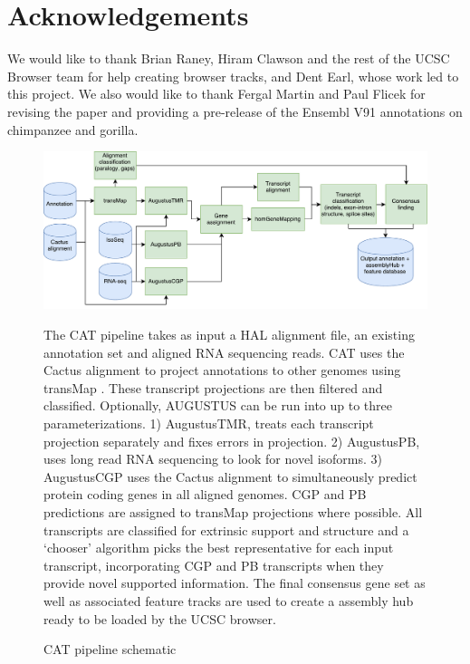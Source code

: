 \documentclass[fleqn,10pt]{wlscirep}
\begin{document}
\section*{Acknowledgements}
We would like to thank Brian Raney, Hiram Clawson and the rest of the UCSC Browser team for help creating browser tracks, and Dent Earl, whose work led to this project. We also would like to thank Fergal Martin and Paul Flicek for revising the paper and providing a pre-release of the Ensembl V91 annotations on chimpanzee and gorilla.


\clearpage

\begin{figure}
\centering
\includegraphics[width=\textwidth,height=\textheight,keepaspectratio]{CAT.pdf}
\caption{CAT pipeline schematic}
The CAT pipeline takes as input a HAL alignment file, an existing annotation set and aligned RNA sequencing reads. CAT uses the Cactus alignment to project annotations to other genomes using transMap \cite{stanke2008using}. These transcript projections are then filtered and classified. Optionally, AUGUSTUS can be run into up to three parameterizations. 1) AugustusTMR, treats each transcript projection separately and fixes errors in projection. 2) AugustusPB, uses long read RNA sequencing to look for novel isoforms. 3) AugustusCGP \cite{konig2015simultaneous} uses the Cactus alignment to simultaneously predict protein coding genes in all aligned genomes. CGP and PB predictions are assigned to transMap projections where possible. All transcripts are classified for extrinsic support and structure and a ‘chooser’ algorithm picks the best representative for each input transcript, incorporating CGP and PB transcripts when they provide novel supported information. The final consensus gene set as well as associated feature tracks are used to create a assembly hub ready to be loaded by the UCSC browser.
\label{fig:fig1}
\end{figure}
\end{document}

